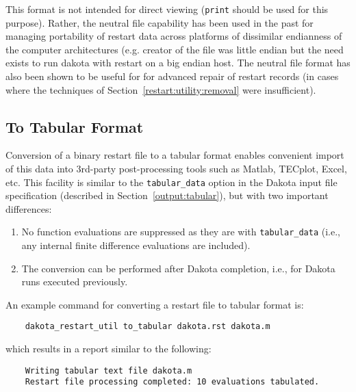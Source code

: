 This format is not intended for direct viewing (\texttt{print} should
be used for this purpose). Rather, the neutral file capability has
been used in the past for managing portability of restart data across
platforms of dissimilar endianness of the computer architectures (e.g.
creator of the file was little endian but the need exists to run dakota with
restart on a big endian host. The neutral file format has also been
shown to be useful for for advanced repair of restart records
(in cases where the techniques of Section~\ref{restart:utility:removal} 
were insufficient).

\subsection{To Tabular Format}\label{restart:utility:tabular}

Conversion of a binary restart file to a tabular format enables
convenient import of this data into 3rd-party post-processing tools
such as Matlab, TECplot, Excel, etc. This facility is similar to the
\texttt{tabular\_data} option in the Dakota input file specification
(described in Section~\ref{output:tabular}), but with two important
differences:
\begin{enumerate}
\item No function evaluations are suppressed as they are with
  \texttt{tabular\_data} (i.e., any internal finite difference
  evaluations are included).
\item The conversion can be performed after Dakota completion, i.e.,
  for Dakota runs executed previously.
\end{enumerate}

An example command for converting a restart file to tabular format is:
\begin{verbatim}
    dakota_restart_util to_tabular dakota.rst dakota.m
\end{verbatim}
which results in a report similar to the following:
\begin{verbatim}
    Writing tabular text file dakota.m
    Restart file processing completed: 10 evaluations tabulated.
\end{verbatim}

